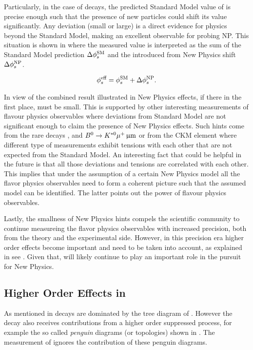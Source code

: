 Particularly, in the case of \BsJpsiPhi decays, the predicted Standard Model value of  is precise enough
such that the presence of new particles could shift its value \cite{Buras:2009if,Chiang:2009ev,Datta:2009fk} significantly.
Any deviation (small or large) is a direct evidence for physics beyond the Standard Model, making \phis an excellent observable for probing NP.
This situation is shown in  where the measured value  is interpreted
as the sum of the Standard Model prediction $\Delta\phi_{s}^{\tiny\text {SM}}$ and the introduced from New Physics shift $\Delta\phi_{s}^{\tiny\text {NP}}$.

\begin{equation}
  \centering
 \phis^{\text {eff}} = \phis^{\tiny \text{SM}} + \Delta\phiS{NP}.
 \label{phis_meas}
\end{equation}

In view of the combined \phis result illustrated in  New Physics effects, if there in the first place, must be small.
This is supported by other interesting measurements of flavour physics observables where deviations from Standard Model are not significant enough
to claim the presence of New Physics effects. Such hints come from the rare decays \Bsmm, \Bdmm \cite{CMS:2014xfa} and $B^0 \rightarrow K^{*0} \mu^+\,\upmu\rm m$\cite{Aaij:2015oid}
or from the \Vub CKM element\cite{Aaij:2015bfa} where different type of measurements exhibit tensions with each other that are not expected from the Standard Model.
An interesting fact that could be helpful in the future is that all those deviations and tensions are
correlated with each other. This implies that under the assumption of a certain New Physics model all the flavor physics
observables need to form a coherent picture such that the assumed model can be identified.
The latter points out the power of flavour physics observables.

Lastly, the smallness of New Physics hints compels the scientific community to continue measureing the
flavor physics observables with increased precision, both from the theory and the experimental side.
However, in this precision era higher order effects become important and need to be taken into account,
as explained in see . Given that, \phis will likely continue to play an important
role in the pursuit for New Physics.

\subsection{Higher Order Effects in \phis}
\label{TheBsJpsiKstDecay}
As mentioned in  \BsJpsiPhi decays are dominated by the tree diagram of .
However the decay also receives contributions from a higher order suppressed process, for example the so called
{\it penguin} diagrams (or topologies) shown in . The \phis measurement of 
ignores the contribution of these penguin diagrams.

